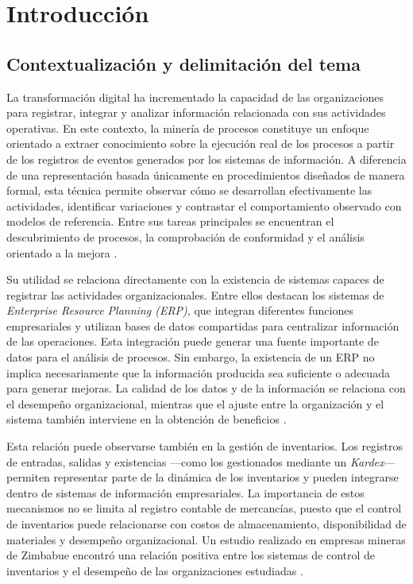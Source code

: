 \documentclass{article}
\begin{document}
    \section{Introducción}
    \subsection{Contextualización y delimitación del tema}

    La transformación digital ha incrementado la capacidad de las organizaciones para registrar, integrar y analizar información relacionada con sus actividades operativas. En este contexto, la minería de procesos constituye un enfoque orientado a extraer conocimiento sobre la ejecución real de los procesos a partir de los registros de eventos generados por los sistemas de información. A diferencia de una representación basada únicamente en procedimientos diseñados de manera formal, esta técnica permite observar cómo se desarrollan efectivamente las actividades, identificar variaciones y contrastar el comportamiento observado con modelos de referencia. Entre sus tareas principales se encuentran el descubrimiento de procesos, la comprobación de conformidad y el análisis orientado a la mejora \cite{marin-castro2021preprocessing}.

    Su utilidad se relaciona directamente con la existencia de sistemas capaces de registrar las actividades organizacionales. Entre ellos destacan los sistemas de \textit{Enterprise Resource Planning (ERP)}, que integran diferentes funciones empresariales y utilizan bases de datos compartidas para centralizar información de las operaciones. Esta integración puede generar una fuente importante de datos para el análisis de procesos. Sin embargo, la existencia de un ERP no implica necesariamente que la información producida sea suficiente o adecuada para generar mejoras. La calidad de los datos y de la información se relaciona con el desempeño organizacional, mientras que el ajuste entre la organización y el sistema también interviene en la obtención de beneficios \cite{erpimpact2024}.

    Esta relación puede observarse también en la gestión de inventarios. Los registros de entradas, salidas y existencias —como los gestionados mediante un \textit{Kardex}— permiten representar parte de la dinámica de los inventarios y pueden integrarse dentro de sistemas de información empresariales. La importancia de estos mecanismos no se limita al registro contable de mercancías, puesto que el control de inventarios puede relacionarse con costos de almacenamiento, disponibilidad de materiales y desempeño organizacional. Un estudio realizado en empresas mineras de Zimbabue encontró una relación positiva entre los sistemas de control de inventarios y el desempeño de las organizaciones estudiadas \cite{inventorycontrol2024}.
\end{document}
